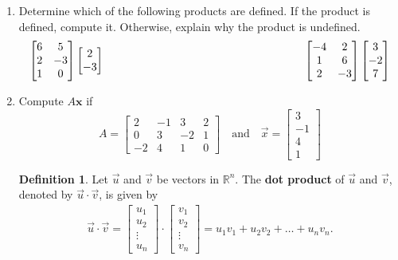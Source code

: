 \documentclass[12pt]{amsart}
\newcommand{\R}{\mathbb{R}}
\theoremstyle{definition}
\newtheorem*{definition}{Definition}
\begin{document}
\begin{enumerate}[itemsep=0.8em,leftmargin=0pt]
\item Determine which of the following products are defined. If the product is defined, compute it. Otherwise, explain why the product is undefined.
\begin{equation*}
\left [ \begin{matrix}
6 & 5 \\
2 & -3 \\
1 & 0 
\end{matrix} \right ]
\left[ \begin{matrix}
2 \\ -3
\end{matrix} \right]
\hspace{2.5in}
\left [ \begin{matrix}
-4 & 2 \\
1 & 6 \\
2 & -3 
\end{matrix} \right ]
\left[ \begin{matrix}
3 \\ -2 \\ 7
\end{matrix} \right]
\end{equation*}


\item Compute $A\mathbf{x}$ if $$A=\begin{bmatrix}2&-1&3&2\\0&3&-2&1\\-2&4&1&0\end{bmatrix}\quad\text{and}\quad \vec{x}=\begin{bmatrix}3\\-1\\4\\1\end{bmatrix}$$


\begin{definition}\label{def:dotproduct}
  Let $\vec{u}$ and $\vec{v}$ be vectors in $\R^n$.  The \textbf{dot
    product} of $\vec{u}$ and $\vec{v}$, denoted by
  $\vec{u}\cdot \vec{v}$, is given by
  \begin{align*}
    \vec{u}\cdot\vec{v}=\begin{bmatrix}u_1\\u_2\\\vdots\\u_n\end{bmatrix}\cdot\begin{bmatrix}v_1\\v_2\\\vdots\\v_n\end{bmatrix}=u_1v_1+u_2v_2+\ldots+u_nv_n.
  \end{align*}
\end{definition}


\end{enumerate}
\end{document}
